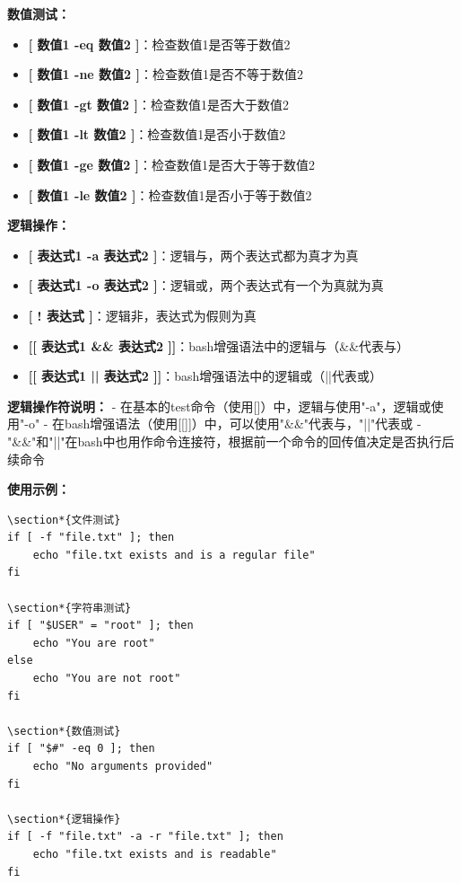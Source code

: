\documentclass[12pt,UTF8]{ctexbook}
\begin{document}
\textbf{数值测试：}
\begin{itemize}
    \item \textbf{[ 数值1 -eq 数值2 ]}：检查数值1是否等于数值2
    \item \textbf{[ 数值1 -ne 数值2 ]}：检查数值1是否不等于数值2
    \item \textbf{[ 数值1 -gt 数值2 ]}：检查数值1是否大于数值2
    \item \textbf{[ 数值1 -lt 数值2 ]}：检查数值1是否小于数值2
    \item \textbf{[ 数值1 -ge 数值2 ]}：检查数值1是否大于等于数值2
    \item \textbf{[ 数值1 -le 数值2 ]}：检查数值1是否小于等于数值2
\end{itemize}

\textbf{逻辑操作：}
\begin{itemize}
    \item \textbf{[ 表达式1 -a 表达式2 ]}：逻辑与，两个表达式都为真才为真
    \item \textbf{[ 表达式1 -o 表达式2 ]}：逻辑或，两个表达式有一个为真就为真
    \item \textbf{[ ! 表达式 ]}：逻辑非，表达式为假则为真
    \item \textbf{[[ 表达式1 \&\& 表达式2 ]]}：bash增强语法中的逻辑与（\&\&代表与）
    \item \textbf{[[ 表达式1 || 表达式2 ]]}：bash增强语法中的逻辑或（||代表或）
\end{itemize}

\textbf{逻辑操作符说明：}
- 在基本的test命令（使用[]）中，逻辑与使用"-a"，逻辑或使用"-o"
- 在bash增强语法（使用[[]]）中，可以使用"\&\&"代表与，"||"代表或
- "\&\&"和"||"在bash中也用作命令连接符，根据前一个命令的回传值决定是否执行后续命令

\textbf{使用示例：}
\begin{verbatim}
\section*{文件测试}
if [ -f "file.txt" ]; then
    echo "file.txt exists and is a regular file"
fi

\section*{字符串测试}
if [ "$USER" = "root" ]; then
    echo "You are root"
else
    echo "You are not root"
fi

\section*{数值测试}
if [ "$#" -eq 0 ]; then
    echo "No arguments provided"
fi

\section*{逻辑操作}
if [ -f "file.txt" -a -r "file.txt" ]; then
    echo "file.txt exists and is readable"
fi
\end{verbatim}
\end{document}
